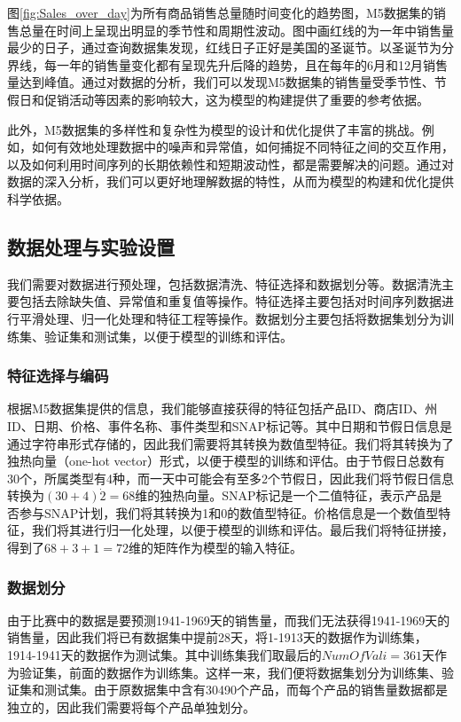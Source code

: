 \documentclass[12pt]{article}
\begin{document}
图\ref{fig:Sales_over_day}为所有商品销售总量随时间变化的趋势图，M5数据集的销售总量在时间上呈现出明显的季节性和周期性波动。图中画红线的为一年中销售量最少的日子，通过查询数据集发现，红线日子正好是美国的圣诞节。以圣诞节为分界线，每一年的销售量变化都有呈现先升后降的趋势，且在每年的6月和12月销售量达到峰值。通过对数据的分析，我们可以发现M5数据集的销售量受季节性、节假日和促销活动等因素的影响较大，这为模型的构建提供了重要的参考依据。

此外，M5数据集的多样性和复杂性为模型的设计和优化提供了丰富的挑战。例如，如何有效地处理数据中的噪声和异常值，如何捕捉不同特征之间的交互作用，以及如何利用时间序列的长期依赖性和短期波动性，都是需要解决的问题。通过对数据的深入分析，我们可以更好地理解数据的特性，从而为模型的构建和优化提供科学依据。

\subsection{数据处理与实验设置}
我们需要对数据进行预处理，包括数据清洗、特征选择和数据划分等。数据清洗主要包括去除缺失值、异常值和重复值等操作。特征选择主要包括对时间序列数据进行平滑处理、归一化处理和特征工程等操作。数据划分主要包括将数据集划分为训练集、验证集和测试集，以便于模型的训练和评估。
\subsubsection*{特征选择与编码}
根据M5数据集提供的信息，我们能够直接获得的特征包括产品ID、商店ID、州ID、日期、价格、事件名称、事件类型和SNAP标记等。其中日期和节假日信息是通过字符串形式存储的，因此我们需要将其转换为数值型特征。我们将其转换为了独热向量（one-hot vector）形式，以便于模型的训练和评估。由于节假日总数有30个，所属类型有4种，而一天中可能会有至多2个节假日，因此我们将节假日信息转换为$(30+4)\dot 2=68$维的独热向量。SNAP标记是一个二值特征，表示产品是否参与SNAP计划，我们将其转换为1和0的数值型特征。价格信息是一个数值型特征，我们将其进行归一化处理，以便于模型的训练和评估。最后我们将特征拼接，得到了$68 + 3 + 1 = 72$维的矩阵作为模型的输入特征。
\subsubsection*{数据划分}
由于比赛中的数据是要预测1941-1969天的销售量，而我们无法获得1941-1969天的销售量，因此我们将已有数据集中提前28天，将1-1913天的数据作为训练集，1914-1941天的数据作为测试集。其中训练集我们取最后的$NumOfVali = 361$天作为验证集，前面的数据作为训练集。这样一来，我们便将数据集划分为训练集、验证集和测试集。由于原数据集中含有30490个产品，而每个产品的销售量数据都是独立的，因此我们需要将每个产品单独划分。
\end{document}
